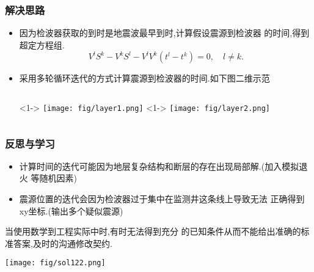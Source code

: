 \documentclass[UTF8]{ctexbeamer}	%
\theoremstyle{plain}
\theoremstyle{definition}
\theoremstyle{remark}
\numberwithin{equation}{section}
\begin{document}
\begin{frame}
    \frametitle{解决思路}
    \begin{itemize}
        \item 因为检波器获取的到时是地震波最早到时,计算假设震源到检波器
        的时间,得到超定方程组.
        \begin{equation}
            V^lS^k - V^kS^l - V^lV^k(t^l-t^k) =0, \quad l \neq k.
        \end{equation}
        \item 采用多轮循环迭代的方式计算震源到检波器的时间.如下图二维示范
        \begin{columns}
            <1->
                \texttt{[image: fig/layer1.png]}
            <1->
            \texttt{[image: fig/layer2.png]}
        \end{columns}
    \end{itemize}
\end{frame}

\begin{frame}
    \frametitle{反思与学习}
    \begin{itemize}
        \item 计算时间的迭代可能因为地层复杂结构和断层的存在出现局部解.(加入模拟退火
        等随机因素)
        \item 震源位置的迭代会因为检波器过于集中在监测井这条线上导致无法
        正确得到xy坐标.(输出多个疑似震源)
    \end{itemize}
    当使用数学到工程实际中时,有时无法得到充分
    的已知条件从而不能给出准确的标准答案,及时的沟通修改契约.
    \begin{center}
    \texttt{[image: fig/sol122.png]}
    \end{center}
\end{frame}
\end{document}
